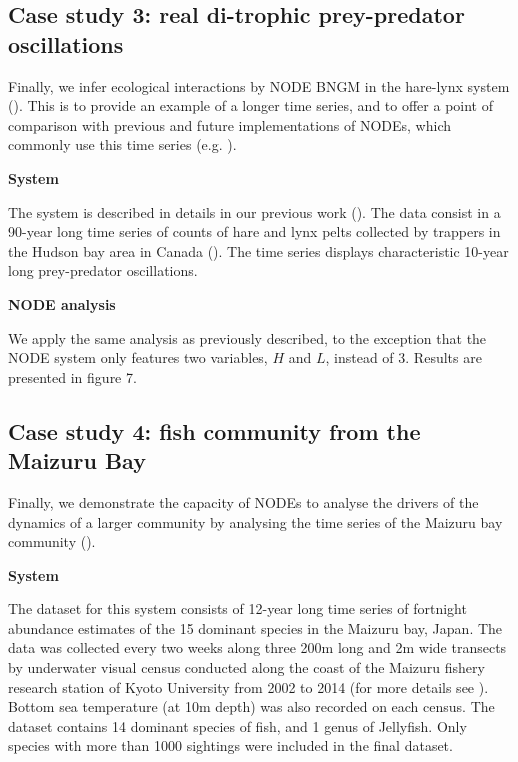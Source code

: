\documentclass[11pt, oneside]{article}
\begin{document}
\subsection{Case study 3: real di-trophic prey-predator oscillations}

Finally, we infer ecological interactions by NODE BNGM in the hare-lynx system (\cite{Odum1972}).
This is to provide an example of a longer time series, and to offer a point of comparison with previous and future implementations of NODEs, which commonly use this time series (e.g. \cite{Bonnaffe2021a,Frank2022}).

\textbf{System}

The system is described in details in our previous work (\cite{Bonnaffe2021a}).
The data consist in a 90-year long time series of counts of hare and lynx pelts collected by trappers in the Hudson bay area in Canada (\cite{Odum1972}).
The time series displays characteristic 10-year long prey-predator oscillations.

\textbf{NODE analysis}

We apply the same analysis as previously described, to the exception that the NODE system only features two variables, $H$ and $L$, instead of 3.
Results are presented in figure 7.

\subsection{Case study 4: fish community from the Maizuru Bay}

Finally, we demonstrate the capacity of NODEs to analyse the drivers of the dynamics of a larger community by analysing the time series of the Maizuru bay community (\cite{Ushio2018}).

\textbf{System}

The dataset for this system consists of 12-year long time series of fortnight abundance estimates of the 15 dominant species in the Maizuru bay, Japan. 
The data was collected every two weeks along three 200m long and 2m wide transects by underwater visual census conducted along the coast of the Maizuru fishery research station of Kyoto University from 2002 to 2014 (for more details see \cite{Ushio2018}).
Bottom sea temperature (at 10m depth) was also recorded on each census.
The dataset contains 14 dominant species of fish, and 1 genus of Jellyfish.
Only species with more than 1000 sightings were included in the final dataset. 
\end{document}
